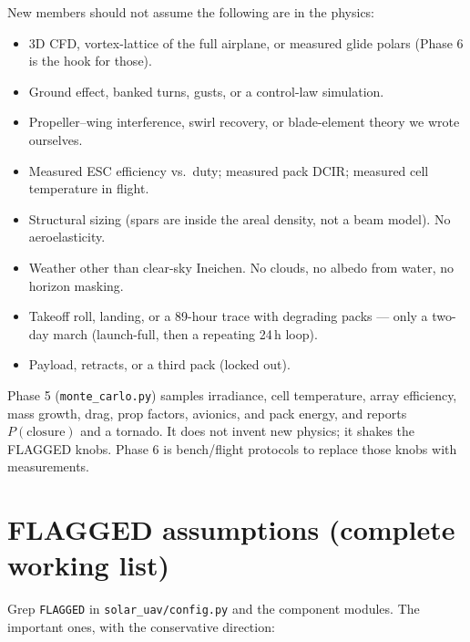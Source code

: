 \documentclass[11pt,letterpaper]{article}
\newcommand{\code}[1]{\texttt{#1}}
\begin{document}
New members should not assume the following are in the physics:

\begin{itemize}
  \item 3D CFD, vortex-lattice of the full airplane, or measured glide polars (Phase 6 is the hook for those).
  \item Ground effect, banked turns, gusts, or a control-law simulation.
  \item Propeller--wing interference, swirl recovery, or blade-element theory we wrote ourselves.
  \item Measured ESC efficiency vs.\ duty; measured pack DCIR; measured cell temperature in flight.
  \item Structural sizing (spars are inside the areal density, not a beam model). No aeroelasticity.
  \item Weather other than clear-sky Ineichen. No clouds, no albedo from water, no horizon masking.
  \item Takeoff roll, landing, or a 89-hour trace with degrading packs --- only a two-day march (launch-full, then a repeating 24\,h loop).
  \item Payload, retracts, or a third pack (locked out).
\end{itemize}

Phase 5 (\code{monte\_carlo.py}) samples irradiance, cell temperature, array efficiency, mass growth, drag, prop factors, avionics, and pack energy, and reports $P(\mathrm{closure})$ and a tornado. It does not invent new physics; it shakes the FLAGGED knobs. Phase 6 is bench/flight protocols to replace those knobs with measurements.

\section{FLAGGED assumptions (complete working list)}

Grep \texttt{FLAGGED} in \code{solar\_uav/config.py} and the component modules. The important ones, with the conservative direction:
\end{document}
